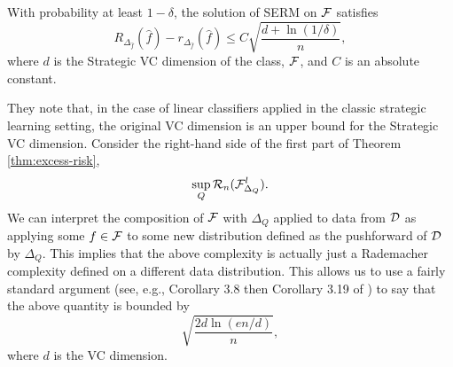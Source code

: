 \begin{theorem}
With probability at least $1-\delta$, the solution of SERM on ${\mathcal{F}}$ satisfies
\begin{equation*}
    R_{\Delta_{\hat{f}}}(\hat{f}) - r_{\Delta_{\hat{f}}}(\hat{f}) \leq C \sqrt{\frac{d + \ln(1/\delta)}{n}},
\end{equation*}
where $d$ is the Strategic VC dimension of the class, ${\mathcal{F}}$, and $C$ is an absolute constant.
\end{theorem}
They note that, in the case of linear classifiers applied in the classic strategic learning setting, the original VC dimension is an upper bound for the Strategic VC dimension. Consider the right-hand side of the first part of Theorem \ref{thm:excess-risk},
\begin{equation}
    \sup_{Q} {\mathcal{R}}_n({\mathcal{F}}_{\Delta_Q}^l).
\end{equation}
We can interpret the composition of ${\mathcal{F}}$ with $\Delta_Q$ applied to data from ${\mathcal{D}}$ as applying some $f \in {\mathcal{F}}$ to some new distribution defined as the pushforward of ${\mathcal{D}}$ by $\Delta_Q$. This implies that the above complexity is actually just a Rademacher complexity defined on a different data distribution. This allows us to use a fairly standard argument (see, e.g., Corollary 3.8 then Corollary 3.19 of \citet{mohri2018foundations}) to say that the above quantity is bounded by
\begin{equation}
    \sqrt{\frac{2d \ln(en/d)}{n}},
\end{equation}
where $d$ is the VC dimension.

